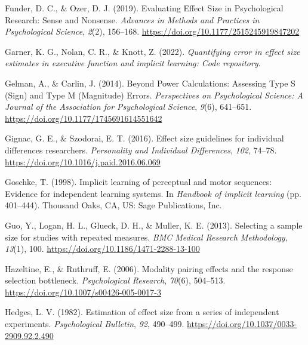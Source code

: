 \documentclass[
  man]{apa6}
\newlength{\cslhangindent}
\newlength{\cslentryspacingunit} %
\newenvironment{CSLReferences}[2] %
 {%
  \setlength{\parindent}{0pt}
  \ifodd #1
  \let\oldpar\par
  \def\par{\hangindent=\cslhangindent\oldpar}
  \fi
  \setlength{\parskip}{#2\cslentryspacingunit}
 }%
 {}
\begin{document}
\begin{CSLReferences}{1}{0}
\leavevmode{}%
Funder, D. C., \& Ozer, D. J. (2019). Evaluating {Effect Size} in {Psychological Research}: {Sense} and {Nonsense}. \emph{Advances in Methods and Practices in Psychological Science}, \emph{2}(2), 156--168. \url{https://doi.org/10.1177/2515245919847202}

\leavevmode{}%
Garner, K. G., Nolan, C. R., \& Knott, Z. (2022). \emph{Quantifying error in effect size estimates in executive function and implicit learning: {Code} repository}.

\leavevmode{}%
Gelman, A., \& Carlin, J. (2014). Beyond {Power Calculations}: {Assessing Type S} ({Sign}) and {Type M} ({Magnitude}) {Errors}. \emph{Perspectives on Psychological Science: A Journal of the Association for Psychological Science}, \emph{9}(6), 641--651. \url{https://doi.org/10.1177/1745691614551642}

\leavevmode{}%
Gignac, G. E., \& Szodorai, E. T. (2016). Effect size guidelines for individual differences researchers. \emph{Personality and Individual Differences}, \emph{102}, 74--78. \url{https://doi.org/10.1016/j.paid.2016.06.069}

\leavevmode{}%
Goschke, T. (1998). Implicit learning of perceptual and motor sequences: {Evidence} for independent learning systems. In \emph{Handbook of implicit learning} (pp. 401--444). {Thousand Oaks, CA, US}: {Sage Publications, Inc}.

\leavevmode{}%
Guo, Y., Logan, H. L., Glueck, D. H., \& Muller, K. E. (2013). Selecting a sample size for studies with repeated measures. \emph{BMC Medical Research Methodology}, \emph{13}(1), 100. \url{https://doi.org/10.1186/1471-2288-13-100}

\leavevmode{}%
Hazeltine, E., \& Ruthruff, E. (2006). Modality pairing effects and the response selection bottleneck. \emph{Psychological Research}, \emph{70}(6), 504--513. \url{https://doi.org/10.1007/s00426-005-0017-3}

\leavevmode{}%
Hedges, L. V. (1982). Estimation of effect size from a series of independent experiments. \emph{Psychological Bulletin}, \emph{92}, 490--499. \url{https://doi.org/10.1037/0033-2909.92.2.490}


\end{CSLReferences}
\end{document}

